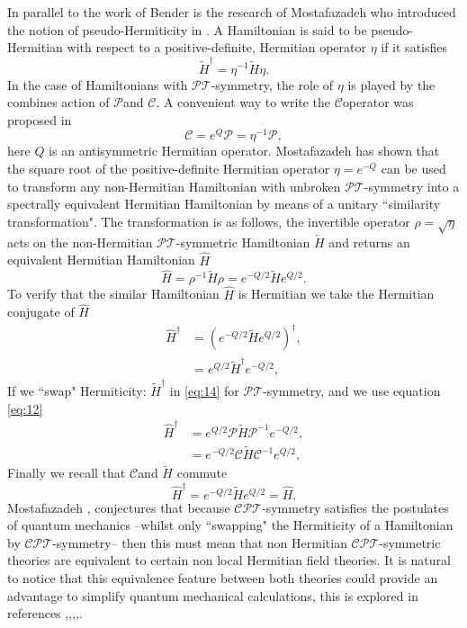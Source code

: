 \documentclass[12pt, a4paper]{report}
\newcommand\PT{\(\mathcal{PT}\)}
\newcommand\PP{\(\mathcal{P}\)}
\newcommand\CPT{\(\mathcal{CPT}\)}
\newcommand\CC{\(\mathcal{C}\)}
\begin{document}
In parallel to the work of Bender is the research of Mostafazadeh who introduced the notion of pseudo-Hermiticity in \cite{Mostafazadeh}. A Hamiltonian is said to be pseudo-Hermitian with respect to a positive-definite, Hermitian operator $\eta$ if it satisfies
\begin{equation}\label{eq:11}
\tilde{H}^{\dagger}  = \eta^{-1}\tilde{H}\eta.
\end{equation}
In the case of Hamiltonians with \PT-symmetry, the role of $\eta$ is played by the combines action of \PP\:and \CC. A convenient way to write the \CC\:operator was proposed in \cite{Bender_2006} 
\begin{equation}\label{eq:12}
\mathcal{C} = e^{Q}\mathcal{P} = \eta^{-1}\mathcal{P} ,
\end{equation}
here $Q$ is an antisymmetric Hermitian operator. Mostafazadeh \cite{Mostafazadeh2} has shown that the square root of the positive-definite Hermitian operator $\eta = e^{-Q}$ can be used to transform any non-Hermitian Hamiltonian with unbroken \PT-symmetry into a spectrally equivalent Hermitian Hamiltonian by means of a unitary ``similarity transformation"\cite{PTvsDH}\cite{Jones_2005}. The transformation is as follows, the invertible operator $\rho = \sqrt{\eta}$ acts on the non-Hermitian \PT-symmetric Hamiltonian $\tilde{H}$ and returns an equivalent Hermitian Hamiltonian $\hat{H}$
\begin{equation}\label{eq:13}
\hat{H} = \rho^{-1}\tilde{H}\rho = e^{-Q/2}\tilde{H}e^{Q/2}.
\end{equation}
To verify that the similar Hamiltonian $\hat{H}$ is Hermitian we take the Hermitian conjugate of $\hat{H}$
\begin{align}\label{eq:14}
\hat{H}^{\dagger} &= (e^{-Q/2}\tilde{H}e^{Q/2})^{\dagger}\nonumber,\\
& = e^{Q/2}\tilde{H}^{\dagger}e^{-Q/2},
\end{align}
If we ``swap" Hermiticity: $\tilde{H}^{\dagger}$ in \ref{eq:14} for \PT-symmetry, and we use equation \ref{eq:12}
\begin{align}\label{eq:15}
\hat{H}^{\dagger} &= e^{Q/2}\mathcal{P}\tilde{H}\mathcal{P}^{-1}e^{-Q/2}\nonumber,\\
&= e^{-Q/2}\mathcal{C}\tilde{H}\mathcal{C}^{-1}e^{Q/2},
\end{align}
Finally we recall that \CC\:and $\tilde{H}$ commute
\begin{equation}\label{eq:16}
\hat{H}^{\dagger} = e^{-Q/2}\tilde{H}e^{Q/2} = \hat{H}.
\end{equation}
Mostafazadeh \cite{Mostafazadeh}, conjectures that because \CPT-symmetry satisfies the postulates of quantum mechanics --whilst only ``swapping" the Hermiticity of a Hamiltonian by \CPT-symmetry-- then this must mean that non Hermitian \CPT-symmetric theories are equivalent to certain non local Hermitian field theories. It is natural to notice that this equivalence feature between both theories could provide an advantage to simplify quantum mechanical calculations, this is explored in references \cite{Mostafazadeh},\cite{EquivalentHH},\cite{Pseudo-HermiticityIII},\cite{Jones_2005},\cite{taleof2potentials}.
\end{document}
